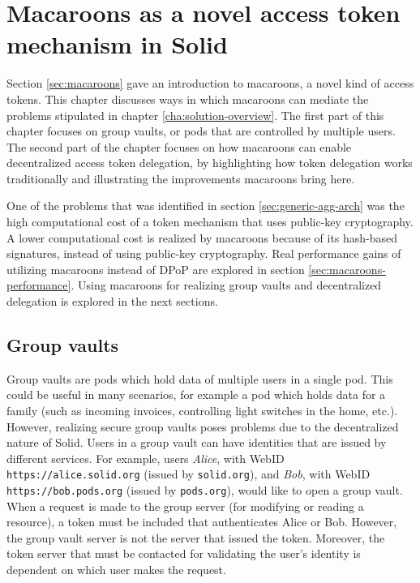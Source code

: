 \chapter{Macaroons as a novel access token mechanism in Solid}
\label{cha:macaroons-solid}

Section \ref{sec:macaroons} gave an introduction to macaroons, a novel kind of access tokens. This chapter discusses ways in which macaroons can mediate the problems stipulated in chapter \ref{cha:solution-overview}. The first part of this chapter focuses on group vaults, or pods that are controlled by multiple users. The second part of the chapter focuses on how macaroons can enable decentralized access token delegation, by highlighting how token delegation works traditionally and illustrating the improvements macaroons bring here.

One of the problems that was identified in section \ref{sec:generic-agg-arch} was the high computational cost of a token mechanism that uses public-key cryptography. A lower computational cost is realized by macaroons because of its hash-based signatures, instead of using public-key cryptography. Real performance gains of utilizing macaroons instead of \gls{DPoP} are explored in section \ref{sec:macaroons-performance}. Using macaroons for realizing group vaults and decentralized delegation is explored in the next sections. 

\section{Group vaults}
\label{sec:group-vaults}
Group vaults are pods which hold data of multiple users in a single pod. This could be useful in many scenarios, for example a pod which holds data for a family (such as incoming invoices, controlling light switches in the home, etc.). However, realizing secure group vaults poses problems due to the decentralized nature of Solid. Users in a group vault can have identities that are issued by different services. For example, users \textit{Alice}, with WebID \texttt{https://alice.solid.org} (issued by \texttt{solid.org}), and \textit{Bob}, with WebID \texttt{https://bob.pods.org} (issued by \texttt{pods.org}), would like to open a group vault. When a request is made to the group server (for modifying or reading a resource), a token must be included that authenticates Alice or Bob. However, the group vault server is not the server that issued the token. Moreover, the token server that must be contacted for validating the user's identity is dependent on which user makes the request. 

